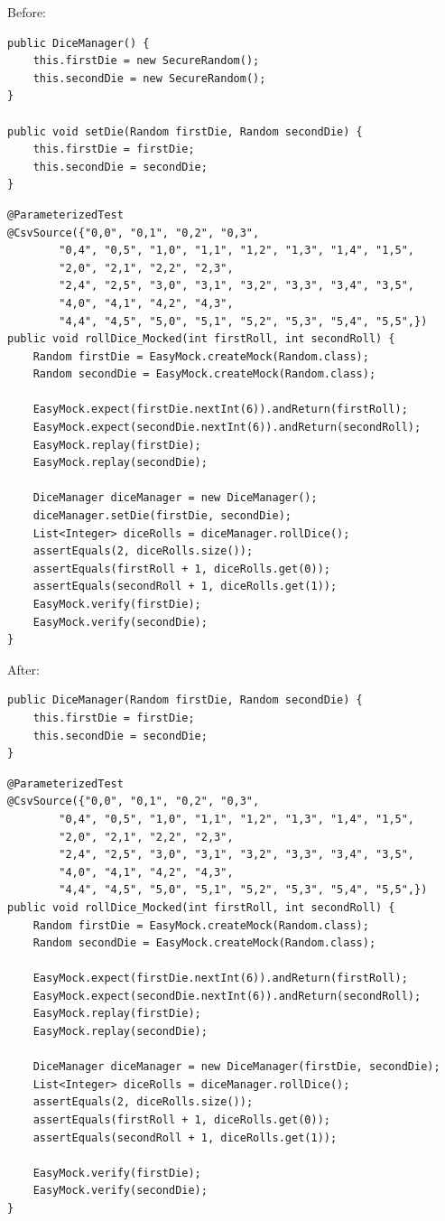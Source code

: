 \documentclass{fank1basedocument}
\begin{document}
Before:
\begin{lstlisting}[style=javacode,language=myJava]
public DiceManager() {
	this.firstDie = new SecureRandom();
	this.secondDie = new SecureRandom();
}

public void setDie(Random firstDie, Random secondDie) {
	this.firstDie = firstDie;
	this.secondDie = secondDie;
}
\end{lstlisting}
\begin{lstlisting}[style=javacode,language=myJava]
@ParameterizedTest
@CsvSource({"0,0", "0,1", "0,2", "0,3",
		"0,4", "0,5", "1,0", "1,1", "1,2", "1,3", "1,4", "1,5",
		"2,0", "2,1", "2,2", "2,3",
		"2,4", "2,5", "3,0", "3,1", "3,2", "3,3", "3,4", "3,5",
		"4,0", "4,1", "4,2", "4,3",
		"4,4", "4,5", "5,0", "5,1", "5,2", "5,3", "5,4", "5,5",})
public void rollDice_Mocked(int firstRoll, int secondRoll) {
	Random firstDie = EasyMock.createMock(Random.class);
	Random secondDie = EasyMock.createMock(Random.class);

	EasyMock.expect(firstDie.nextInt(6)).andReturn(firstRoll);
	EasyMock.expect(secondDie.nextInt(6)).andReturn(secondRoll);
	EasyMock.replay(firstDie);
	EasyMock.replay(secondDie);

	DiceManager diceManager = new DiceManager();
	diceManager.setDie(firstDie, secondDie);
	List<Integer> diceRolls = diceManager.rollDice();
	assertEquals(2, diceRolls.size());
	assertEquals(firstRoll + 1, diceRolls.get(0));
	assertEquals(secondRoll + 1, diceRolls.get(1));
	EasyMock.verify(firstDie);
	EasyMock.verify(secondDie);
}
\end{lstlisting}
After:
\begin{lstlisting}[style=javacode,language=myJava]
public DiceManager(Random firstDie, Random secondDie) {
	this.firstDie = firstDie;
	this.secondDie = secondDie;
}
\end{lstlisting}
\begin{lstlisting}[style=javacode,language=myJava]
@ParameterizedTest
@CsvSource({"0,0", "0,1", "0,2", "0,3",
		"0,4", "0,5", "1,0", "1,1", "1,2", "1,3", "1,4", "1,5",
		"2,0", "2,1", "2,2", "2,3",
		"2,4", "2,5", "3,0", "3,1", "3,2", "3,3", "3,4", "3,5",
		"4,0", "4,1", "4,2", "4,3",
		"4,4", "4,5", "5,0", "5,1", "5,2", "5,3", "5,4", "5,5",})
public void rollDice_Mocked(int firstRoll, int secondRoll) {
	Random firstDie = EasyMock.createMock(Random.class);
	Random secondDie = EasyMock.createMock(Random.class);

	EasyMock.expect(firstDie.nextInt(6)).andReturn(firstRoll);
	EasyMock.expect(secondDie.nextInt(6)).andReturn(secondRoll);
	EasyMock.replay(firstDie);
	EasyMock.replay(secondDie);

	DiceManager diceManager = new DiceManager(firstDie, secondDie);
	List<Integer> diceRolls = diceManager.rollDice();
	assertEquals(2, diceRolls.size());
	assertEquals(firstRoll + 1, diceRolls.get(0));
	assertEquals(secondRoll + 1, diceRolls.get(1));

	EasyMock.verify(firstDie);
	EasyMock.verify(secondDie);
}
\end{lstlisting}
\end{document}

